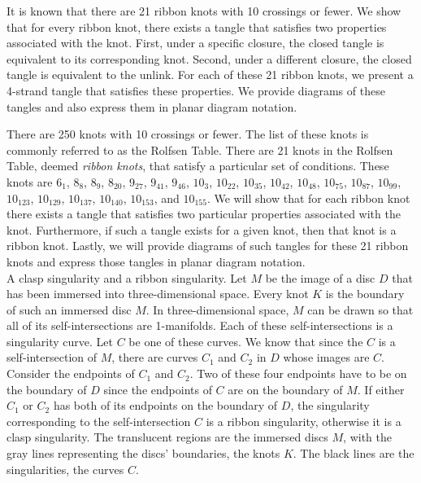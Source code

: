 
\diagrams
\singlecolumn
\theorems

\begin{paperabs}
It is known that there are 21 ribbon knots with 10 crossings or fewer.
We show that for every ribbon knot, there exists a tangle that satisfies two
properties associated with the knot.
First, under a specific closure, the closed tangle is equivalent to its
corresponding knot.
Second, under a different closure, the closed tangle is equivalent to the
unlink.
For each of these 21 ribbon knots, we present a 4-strand tangle that
satisfies these properties.
We provide diagrams of these tangles and also express them in planar diagram
notation.
\end{paperabs}
\begin{paper}

There are 250 knots with 10 crossings or fewer.
The list of these knots is commonly referred to as the Rolfsen Table.
There are 21 knots in the Rolfsen Table, deemed \textit{ribbon knots}, that
satisfy a particular set of conditions.
These knots are $6_1$, $8_8$, $8_9$, $8_{20}$, $9_{27}$, $9_{41}$, $9_{46}$,
$10_3$, $10_{22}$, $10_{35}$, $10_{42}$, $10_{48}$, $10_{75}$, $10_{87}$,
$10_{99}$, $10_{123}$, $10_{129}$, $10_{137}$, $10_{140}$, $10_{153}$, and
$10_{155}$.
We will show that for each ribbon knot there exists a tangle that satisfies two
particular properties associated with the knot.
Furthermore, if such a tangle exists for a given knot, then that knot is a
ribbon knot.
Lastly, we will provide diagrams of such tangles for these 21 ribbon knots and
express those tangles in planar diagram notation.\\

{A clasp singularity and a ribbon singularity.
Let $M$ be the image of a disc $D$ that has been immersed into three-dimensional
space.
Every knot $K$ is the boundary of such an immersed disc $M$.
In three-dimensional space, $M$ can be drawn so that all of its
self-intersections are 1-manifolds.
Each of these self-intersections is a singularity curve.
Let $C$ be one of these curves.
We know that since the $C$ is a self-intersection of $M$, there are curves $C_1$
and $C_2$ in $D$ whose images are $C$.
Consider the endpoints of $C_1$ and $C_2$.
Two of these four endpoints have to be on the boundary of $D$ since the
endpoints of $C$ are on the boundary of $M$.
If either $C_1$ or $C_2$ has both of its endpoints on the boundary of $D$, the
singularity corresponding to the self-intersection $C$ is a ribbon singularity,
otherwise it is a clasp singularity.
The translucent regions are the immersed discs $M$, with the gray lines
representing the discs' boundaries, the knots $K$.
The black lines are the singularities, the curves $C$.}\\


\end{paper}

